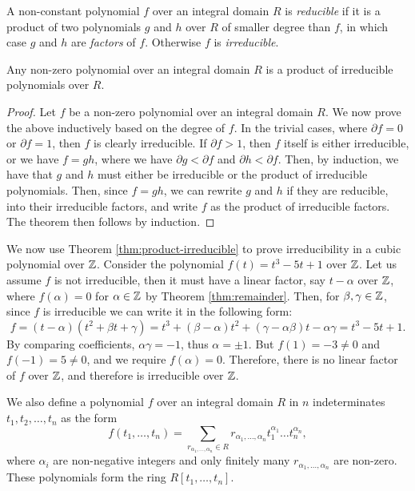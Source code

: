 \begin{definition}
     A non-constant polynomial $f$ over an integral domain $R$ is \textit{reducible} if it is a product of two polynomials $g$ and $h$ over $R$ of smaller degree than $f$, in which case $g$ and $h$ are \textit{factors} of $f$. Otherwise $f$ is \textit{irreducible}. 
\end{definition}

\begin{theorem} \label{thm:product-irreducible}
    Any non-zero polynomial over an integral domain $R$ is a product of irreducible polynomials over $R$.
\end{theorem}

\begin{proof}
    Let $f$ be a non-zero polynomial over an integral domain $R$. We now prove the above inductively based on the degree of $f$. In the trivial cases, where $\partial f =0$ or $\partial f = 1$, then $f$ is clearly irreducible. If $\partial f > 1$, then $f$ itself is either irreducible, or we have $f=gh$, where we have $\partial g < \partial f$ and $\partial h < \partial f$. Then, by induction, we have that $g$ and $h$ must either be irreducible or the product of irreducible polynomials. Then, since $f=gh$, we can rewrite $g$ and $h$ if they are reducible, into their irreducible factors, and write $f$ as the product of irreducible factors. The theorem then follows by induction. 
\end{proof}

\begin{example}
    We now use Theorem \ref{thm:product-irreducible} to prove irreducibility in a cubic polynomial over $\mathbb Z$. Consider the polynomial $f(t)=t^3-5t+1$ over $\mathbb Z$. Let us assume $f$ is not irreducible, then it must have a linear factor, say $t-\alpha$ over $\mathbb Z$, where $f(\alpha)=0$ for $\alpha \in \mathbb Z$ by Theorem \ref{thm:remainder}. Then, for $\beta, \gamma \in \mathbb Z$, since $f$ is irreducible we can write it in the following form:
    $$f=(t-\alpha)(t^2+\beta t + \gamma) = t^3 + (\beta - \alpha)t^2 + (\gamma - \alpha \beta)t - \alpha \gamma = t^3 -5t+1.$$
    By comparing coefficients, $\alpha \gamma = -1$, thus $\alpha = \pm 1$. But $f(1) = -3 \neq 0$ and $f(-1) = 5 \neq 0$, and we require $f(\alpha)=0$. Therefore, there is no linear factor of $f$ over $\mathbb Z$, and therefore is irreducible over $\mathbb Z$.
\end{example}

We also define a polynomial $f$ over an integral domain $R$ in $n$ indeterminates $t_1, t_2, \dots, t_n$ as the form 
$$
f(t_1, \dots, t_n) = \sum _{ r_{\alpha_1, \dots, \alpha_n} \in R}  r_{\alpha_1, \dots, \alpha_n} t_1^{\alpha_1} \dots t_n ^{\alpha_n},
$$
where $\alpha_i$ are non-negative integers and only finitely many $r_{\alpha_1, \dots, \alpha_n}$ are non-zero. These polynomials form the ring $R[t_1, \dots, t_n]$.


